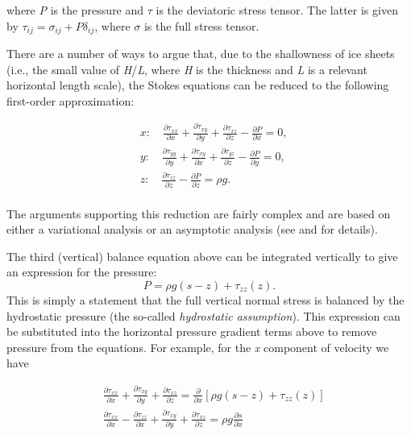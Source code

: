 \noindent
where \textit{P} is the pressure and {\large \(\tau{}\)} is the deviatoric stress tensor. The latter is given by $\tau _{ij}=\sigma _{ij}+P\delta _{ij}$, 
where {\large \(\sigma{}\)} is the full stress tensor.

There are a number of ways to argue that, due to the shallowness of ice sheets (i.e., the small value of \textit{H}/\textit{L}, where \textit{H} is the thickness and \textit{L} is a relevant horizontal length scale), the Stokes equations can be reduced to the following first-order approximation:

\begin{equation}
  \begin{split}
    & x:\quad \frac{\partial \tau _{xx}}{\partial x} + \frac{\partial \tau _{xy}}{\partial y} + \frac{\partial \tau _{xz}}{\partial z} - \frac{\partial P}{\partial x} = 0, \\ 
    & y:\quad \frac{\partial \tau _{yy}}{\partial y} + \frac{\partial \tau _{xy}}{\partial x} + \frac{\partial \tau _{yz}}{\partial z} - \frac{\partial P}{\partial y} = 0, \\ 
    & z:\quad \frac{\partial \tau _{zz}}{\partial z} - \frac{\partial P}{\partial z} = \rho g. \\ 
  \end{split}
\end{equation}

\noindent
The arguments supporting this reduction are fairly complex and are based on either a variational analysis or an asymptotic analysis (see \citet{Schoof:2010dl} and \citet{DUKOWICZ:2010wb} for details).

The third (vertical) balance equation above can be integrated vertically to give an expression for the pressure:
\begin{equation}
P = \rho g\left( s-z \right) + \tau _{zz}(z).
\end{equation} 
This is simply a statement that the full vertical normal stress is balanced by the hydrostatic pressure (the so-called \textit{hydrostatic assumption}). This expression can be substituted into the horizontal pressure gradient terms above to remove pressure from the equations. For example, for the \textit{x} component of velocity we have

\begin{equation}
  \label{ho.eq.x_stress_balance}
  \begin{split}
    & \frac{\partial \tau _{xx}}{\partial x} + \frac{\partial \tau _{xy}}{\partial y} + \frac{\partial \tau _{xz}}{\partial z} = \frac{\partial }{\partial x}\left[ \rho g\left( s-z \right)+\tau _{zz}(z) \right] \\ 
    & \frac{\partial \tau _{xx}}{\partial x} - \frac{\partial \tau _{zz}}{\partial x} + \frac{\partial \tau _{xy}}{\partial y} + \frac{\partial \tau _{xz}}{\partial z} = \rho g\frac{\partial s}{\partial x} \\ 
  \end{split}
\end{equation}

